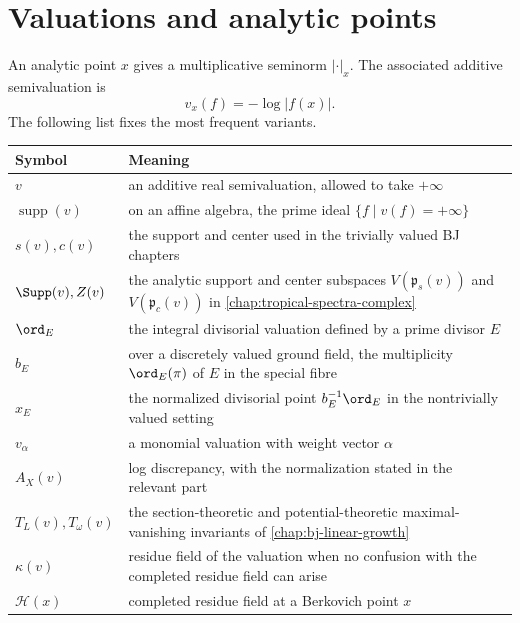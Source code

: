 \section{Valuations and analytic points}
\label{sec:appK-valuations}


An analytic point \(x\) gives a multiplicative seminorm \(|\cdot|_x\).
The associated additive semivaluation is
\[
 v_x(f)=-\log|f(x)|.
\]
The following list fixes the most frequent variants.

\begin{center}
\begin{tabular}{@{}p{}p{}@{}}
\toprule
Symbol & Meaning \\
\midrule
\(v\)
  & an additive real semivaluation, allowed to take \(+\infty\) \\
\(\operatorname{supp}(v)\)
  & on an affine algebra, the prime ideal
    \(\{f\mid v(f)=+\infty\}\) \\
\(s(v),c(v)\)
  & the support and center used in the trivially valued BJ chapters \\
\(\Supp(v),Z(v)\)
  & the analytic support and center subspaces
    \(V(\mathfrak p_s(v))\) and \(V(\mathfrak p_c(v))\) in
    \cref{chap:tropical-spectra-complex} \\
\(\ord_E\)
  & the integral divisorial valuation defined by a prime divisor \(E\) \\
\(b_E\)
  & over a discretely valued ground field, the multiplicity
    \(\ord_E(\pi)\) of \(E\) in the special fibre \\
\(x_E\)
  & the normalized divisorial point \(b_E^{-1}\ord_E\) in the
    nontrivially valued setting \\
\(v_\alpha\)
  & a monomial valuation with weight vector \(\alpha\) \\
\(A_X(v)\)
  & log discrepancy, with the normalization stated in the relevant part \\
\(T_L(v),T_\omega(v)\)
  & the section-theoretic and potential-theoretic maximal-vanishing
    invariants of \cref{chap:bj-linear-growth} \\
\(\kappa(v)\)
  & residue field of the valuation when no confusion with the completed
    residue field can arise \\
\(\mathcal H(x)\)
  & completed residue field at a Berkovich point \(x\) \\
\bottomrule
\end{tabular}
\end{center}

